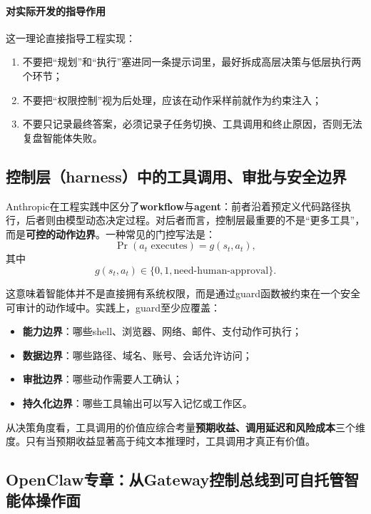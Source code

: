 \documentclass[12pt,a4paper]{article}
\begin{document}
\paragraph{对实际开发的指导作用}

这一理论直接指导工程实现：
\begin{enumerate}
    \item 不要把“规划”和“执行”塞进同一条提示词里，最好拆成高层决策与低层执行两个环节；
    \item 不要把“权限控制”视为后处理，应该在动作采样前就作为约束注入；
    \item 不要只记录最终答案，必须记录子任务切换、工具调用和终止原因，否则无法复盘智能体失败。
\end{enumerate}

\subsection{控制层（harness）中的工具调用、审批与安全边界}

Anthropic在工程实践中区分了\textbf{workflow}与\textbf{agent}：前者沿着预定义代码路径执行，后者则由模型动态决定过程。对后者而言，控制层最重要的不是“更多工具”，而是\textbf{可控的动作边界}。一种常见的门控写法是：
\begin{equation}
\Pr(a_t \text{ executes}) = g(s_t, a_t),
\end{equation}
其中
\begin{equation}
g(s_t, a_t) \in \{0, 1, \text{need-human-approval}\}.
\end{equation}

这意味着智能体并不是直接拥有系统权限，而是通过guard函数被约束在一个安全可审计的动作域中。实践上，guard至少应覆盖：
\begin{itemize}
    \item \textbf{能力边界}：哪些shell、浏览器、网络、邮件、支付动作可执行；
    \item \textbf{数据边界}：哪些路径、域名、账号、会话允许访问；
    \item \textbf{审批边界}：哪些动作需要人工确认；
    \item \textbf{持久化边界}：哪些工具输出可以写入记忆或工作区。
\end{itemize}

从决策角度看，工具调用的价值应综合考量\textbf{预期收益、调用延迟和风险成本}三个维度。只有当预期收益显著高于纯文本推理时，工具调用才真正有价值。
\subsection{OpenClaw专章：从Gateway控制总线到可自托管智能体操作面}
\end{document}
